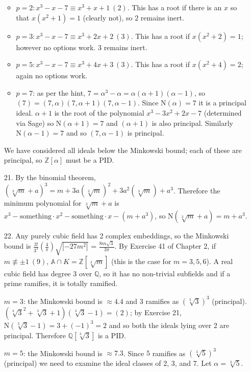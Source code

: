 \documentclass{article}
\newcommand{\Q}[0]{\mathbb{Q}}
\newcommand{\Z}[0]{\mathbb{Z}}
\newcommand{\norm}[0]{\text{N}}
\newcommand{\modequiv}[3]{#1 \equiv #2\ (#3)}
\newcommand{\modnotequiv}[3]{#1 \not\equiv #2\ (#3)}
\newcommand{\ringofintegers}[1]{\mathbb{A} \cap #1}
\begin{document}
\begin{enumerate}
    \begin{itemize}
        \item $p = 2: \modequiv{x^3 - x - 7}{x^3 + x + 1}{2}$.  This has a root if there is an $x$ so that $x(x^2 + 1) = 1$ (clearly not), so 2 remains inert.
        \item $p = 3: \modequiv{x^3 - x - 7}{x^3 + 2x + 2}{3}$.  This has a root if $x(x^2 + 2) = 1$; however no options work.  3 remains inert.
        \item $p = 5: \modequiv{x^3 - x - 7}{x^3 + 4x + 3}{3}$.  This has a root if $x(x^2 + 4) = 2$; again no options work.
        \item $p = 7$: as per the hint, $7 = \alpha^3 - \alpha = \alpha(\alpha + 1)(\alpha - 1)$, so $(7) = (7, \alpha)(7, \alpha + 1)(7, \alpha - 1)$.  Since $\norm(\alpha) = 7$ it is a principal ideal.  $\alpha + 1$ is the root of the polynomial $x^3 - 3x^2 + 2x - 7$ (determined via Sage) so $\norm(\alpha + 1) = 7$ and $(\alpha + 1)$ is also principal.  Similarly $\norm(\alpha - 1) = 7$ and so $(7, \alpha - 1)$ is principal.
    \end{itemize}

    We have considered all ideals below the Minkowski bound; each of these are principal, so $\Z[\alpha]$ must be a PID.

    \item [21.] By the binomial theorem, $(\sqrt[3]{m} + a)^3 = m + 3a(\sqrt[3]{m})^2 + 3a^2(\sqrt[3]{m}) + a^3$.  Therefore the minimum polynomial for $\sqrt[3]{m} + a$ is $x^3 - \text{something}\cdot x^2 - \text{something} \cdot x - (m + a^3)$, so $\norm(\sqrt[3]{m} + a) = m + a^3$.

    \item [22.] Any purely cubic field has 2 complex embeddings, so the Minkowski bound is $\frac{3!}{3^3}\left(\frac{4}{\pi}\right)\sqrt{|-27m^2|}$ = $\frac{8m\sqrt{3}}{3\pi}$.  By Exercise 41 of Chapter 2, if $\modnotequiv{m}{\pm 1}{9}$,  $\ringofintegers{K} = \Z[\sqrt[3]{m}]$ (this is the case for $m = 3, 5, 6$).  A real cubic field has degree 3 over $\Q$, so it has no non-trivial subfields and if a prime ramifies, it is totally ramified.

    $m = 3$: the Minkowski bound is $\approx 4.4$ and 3 ramifies as $(\sqrt[3]{3})^3$ (principal).  $(\sqrt[3]{3}^2 + \sqrt[3]{3} + 1)(\sqrt[3]{3} - 1) = (2)$; by Exercise 21, $\norm(\sqrt[3]{3} - 1) = 3 + (-1)^3 = 2$ and so both the ideals lying over 2 are principal.  Therefore $\Q[\sqrt[3]{3}]$ is a PID.

    $m = 5$: the Minkowski bound is $\approx 7.3$.  Since $5$ ramifies as $(\sqrt[3]{5})^3$ (principal) we need to examine the ideal classes of 2, 3, and 7.  Let $\alpha = \sqrt[3]{5}$.


\end{enumerate}
\end{document}
